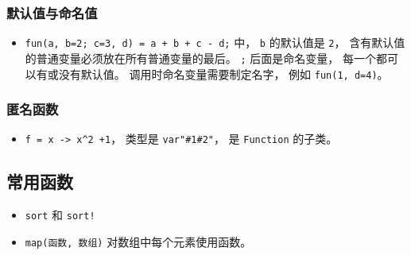 \subsubsection{默认值与命名值}
\begin{itemize}
\item \verb`fun(a, b=2; c=3, d) = a + b + c - d;` 中， \verb`b` 的默认值是 \verb`2`， 含有默认值的普通变量必须放在所有普通变量的最后。 \verb`;` 后面是命名变量， 每一个都可以有或没有默认值。 调用时命名变量需要制定名字， 例如 \verb`fun(1, d=4)`。
\end{itemize}

\subsubsection{匿名函数}
\begin{itemize}
\item \verb`f = x -> x^2 +1`， 类型是 \verb`var"#1#2"`， 是 \verb`Function` 的子类。
\end{itemize}

\subsection{常用函数}
\begin{itemize}
\item \verb`sort` 和 \verb`sort!`
\item \verb`map(函数, 数组)` 对数组中每个元素使用函数。
\end{itemize}
